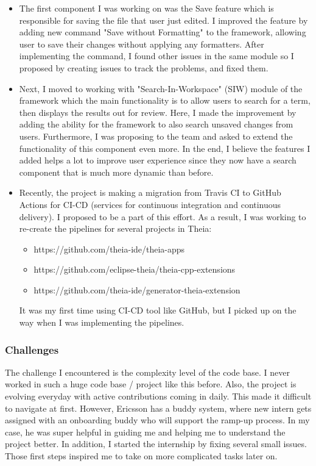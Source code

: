 \begin{itemize}
    \item 
The first component I was working on was the Save feature which is responsible for saving the file that user just edited.
I improved the feature by adding new command "Save without Formatting" to the framework, allowing user to save their changes without applying any formatters.
After implementing the command, I found other issues in the same module so I proposed by creating issues to track the problems, and fixed them.
    \item
Next, I moved to working with "Search-In-Workspace" (SIW) module of the framework which the main functionality is to allow users to search for a term, then displays the results out for review.
Here, I made the improvement by adding the ability for the framework to also search unsaved changes from users. Furthermore, I was proposing to the team and asked to extend the functionality of this component even more.
In the end, I believe the features I added helps a lot to improve user experience since they now have a search component that is much more dynamic than before.
    \item 
Recently, the project is making a migration from Travis CI to GitHub Actions for CI-CD (services for continuous integration and continuous delivery).
I proposed to be a part of this effort. As a result, I was working to re-create the pipelines for several projects in Theia:
        \begin{itemize}
            \item https://github.com/theia-ide/theia-apps
            \item https://github.com/eclipse-theia/theia-cpp-extensions
            \item https://github.com/theia-ide/generator-theia-extension
        \end{itemize}
It was my first time using CI-CD tool like GitHub, but I picked up on the way when I was implementing the pipelines.
\end{itemize}

\newpage
\subsubsection{Challenges}

The challenge I encountered is the complexity level of the code base. I never worked in such a huge code base / project like this before. Also, the project is evolving everyday with active contributions coming in daily.
This made it difficult to navigate at first. However, Ericsson has a buddy system, where new intern gets assigned with an onboarding buddy who will support the ramp-up process.
In my case, he was super helpful in guiding me and helping me to understand the project better.
In addition, I started the internship by fixing several small issues. Those first steps inspired me to take on more complicated tasks later on.

